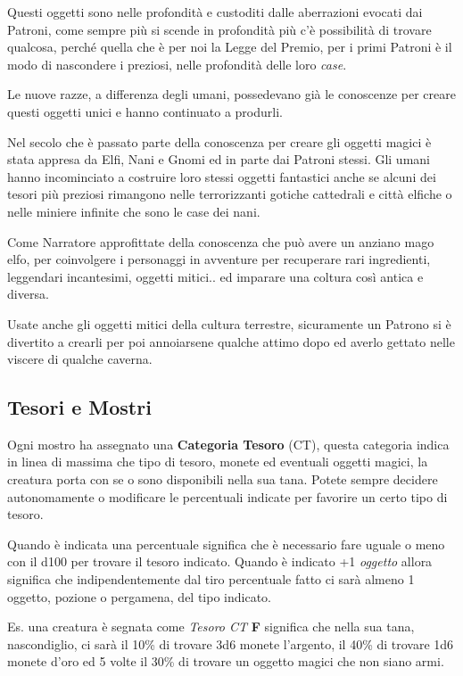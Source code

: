 \begin{multicols}{2}
Questi oggetti sono nelle profondità e custoditi dalle aberrazioni evocati dai Patroni, come sempre più si scende in profondità più c'è possibilità di trovare qualcosa, perché quella che è per noi la Legge del Premio, per i primi Patroni è il modo di nascondere i preziosi, nelle profondità delle loro \emph{case}.

Le nuove razze, a differenza degli umani, possedevano già le conoscenze per creare questi oggetti unici e hanno continuato a produrli. 

Nel secolo che è passato parte della conoscenza per creare gli oggetti magici è stata appresa da Elfi, Nani e Gnomi ed in parte dai Patroni stessi. Gli umani hanno incominciato a costruire loro stessi oggetti fantastici anche se alcuni dei tesori più preziosi rimangono nelle terrorizzanti gotiche cattedrali e città elfiche o nelle miniere infinite che sono le case dei nani.

Come Narratore approfittate della conoscenza che può avere un anziano mago elfo, per coinvolgere i personaggi in avventure per recuperare rari ingredienti, leggendari incantesimi, oggetti mitici.. ed imparare una coltura così antica e diversa.

Usate anche gli oggetti mitici della cultura terrestre, sicuramente un Patrono si è divertito a crearli per poi annoiarsene qualche attimo dopo ed averlo gettato nelle viscere di qualche caverna.

\subsection{Tesori e Mostri}

Ogni mostro ha assegnato una \textbf{Categoria Tesoro} (CT), questa categoria indica in linea di massima che tipo di tesoro, monete ed eventuali oggetti magici, la creatura porta con se o sono disponibili nella sua tana. Potete sempre decidere autonomamente o modificare le percentuali indicate per favorire un certo tipo di tesoro.

Quando è indicata una percentuale significa che è necessario fare uguale o meno con il d100 per trovare il tesoro indicato. Quando è indicato +1 \emph{oggetto} allora significa che indipendentemente dal tiro percentuale fatto ci sarà almeno 1 oggetto, pozione o pergamena, del tipo indicato.

Es. una creatura è segnata come \emph{Tesoro CT} \textbf{F} significa che nella sua tana, nascondiglio, ci sarà il 10\% di trovare 3d6 monete l'argento, il 40\% di trovare 1d6 monete d'oro ed 5 volte il 30\% di trovare un oggetto magici che non siano armi.


\end{multicols}
